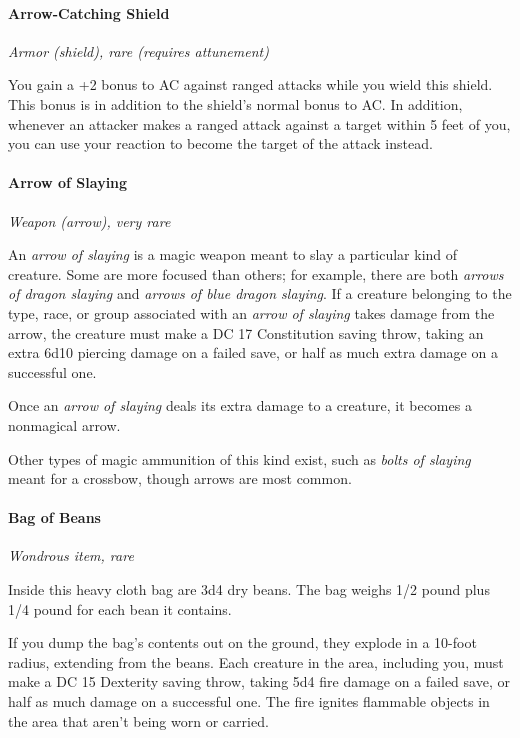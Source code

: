 \documentclass[
]{article}
\begin{document}
\hypertarget{arrow-catching-shield}{%
\paragraph{Arrow-Catching Shield}\label{arrow-catching-shield}}

\emph{Armor (shield), rare (requires attunement)}

You gain a +2 bonus to AC against ranged attacks while you wield this
shield. This bonus is in addition to the shield's normal bonus to AC. In
addition, whenever an attacker makes a ranged attack against a target
within 5 feet of you, you can use your reaction to become the target of
the attack instead.

\hypertarget{arrow-of-slaying}{%
\paragraph{Arrow of Slaying}\label{arrow-of-slaying}}

\emph{Weapon (arrow), very rare}

An \emph{arrow of slaying} is a magic weapon meant to slay a particular
kind of creature. Some are more focused than others; for example, there
are both \emph{arrows of dragon slaying} and \emph{arrows of blue dragon
slaying}. If a creature belonging to the type, race, or group associated
with an \emph{arrow of slaying} takes damage from the arrow, the
creature must make a DC 17 Constitution saving throw, taking an extra
6d10 piercing damage on a failed save, or half as much extra damage on a
successful one.

Once an \emph{arrow of slaying} deals its extra damage to a creature, it
becomes a nonmagical arrow.

Other types of magic ammunition of this kind exist, such as \emph{bolts
of slaying} meant for a crossbow, though arrows are most common.

\hypertarget{bag-of-beans}{%
\paragraph{Bag of Beans}\label{bag-of-beans}}

\emph{Wondrous item, rare}

Inside this heavy cloth bag are 3d4 dry beans. The bag weighs 1/2 pound
plus 1/4 pound for each bean it contains.

If you dump the bag's contents out on the ground, they explode in a
10-foot radius, extending from the beans. Each creature in the area,
including you, must make a DC 15 Dexterity saving throw, taking 5d4 fire
damage on a failed save, or half as much damage on a successful one. The
fire ignites flammable objects in the area that aren't being worn or
carried.
\end{document}
